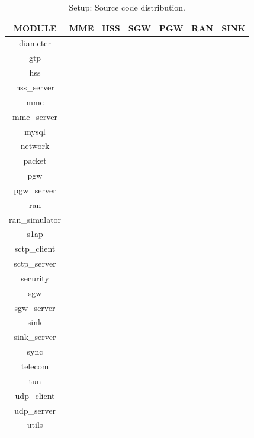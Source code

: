 \pdfminorversion=4\documentclass[hidelinks]{report}
\newcommand{\T} {
	\checkmark
}
\begin{document}
\begin{enumerate}
\begin{table}[H]

\caption{Setup: Source code distribution.}
\centering
\label{distribution}
\def\arraystretch{1.5}

\begin{tabular}{|c|c|c|c|c|c|c|}

\hline
\textbf{MODULE} & \textbf{MME} & \textbf{HSS} & \textbf{SGW} & \textbf{PGW} & \textbf{RAN} & \textbf{SINK} \\
\hline
diameter & \T & \T & \T & \T & \T & \T \\
gtp & \T & \T & \T & \T & \T & \T \\
hss & & \T & & & & \\
hss\_server & & \T & & & & \\
mme & \T & & & & & \\
mme\_server & \T & & & & & \\
mysql & & \T & & & & \\
network & \T & \T & \T & \T & \T & \T \\
packet & \T & \T & \T & \T & \T & \T \\
pgw & & & & \T & & \\
pgw\_server & & & & \T & & \\
ran & & & & & \T & \\
ran\_simulator & & & & & \T & \\
s1ap & \T & \T & \T & \T & \T & \T \\
sctp\_client & \T & & & & \T & \\
sctp\_server & \T & \T & & & & \\
security & \T & & & & \T & \\
sgw & & & \T & & & \\
sgw\_server & & & \T & & & \\
sink & & & & & & \T \\
sink\_server & & & & & & \T \\
sync & \T & \T & \T & \T & \T & \\
telecom & \T & & & & \T & \\
tun & & & & & \T & \T \\
udp\_client & \T & & \T & \T & \T & \T \\
udp\_server & & & \T & \T & \T & \T \\
utils & \T & \T & \T & \T & \T & \T \\
\hline

\end{tabular}

\end{table}


\end{enumerate}
\end{document}
